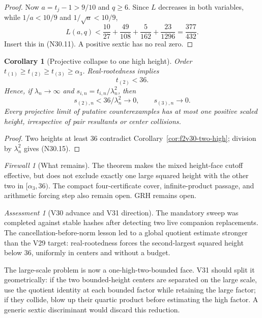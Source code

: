 \documentclass[11pt]{article}
\newtheorem{corollary}[theorem]{Corollary}
\theoremstyle{definition}
\theoremstyle{remark}
\newtheorem{assessment}[theorem]{Assessment}
\newtheorem{firewall}[theorem]{Firewall}
\begin{document}
\begin{proof}
Now \(a=t_j-1>9/10\) and \(q\geq6\).  Since \(L\) decreases in both
variables, while \(1/a<10/9\) and \(1/\sqrt a<10/9\),
\[
 L(a,q)<\frac{10}{27}+\frac{49}{108}
 +\frac5{162}+\frac{23}{1296}=\frac{377}{432}.
 \tag{N30.13}
\]
Insert this in \textup{(N30.11)}.  A positive sextic has no real zero.
\end{proof}

\begin{corollary}[Projective collapse to one high height]
\label{cor:f2v30-projective-collapse}
Order
\(t_{(1)}\geq t_{(2)}\geq t_{(3)}\geq\alpha_3\).  Real-rootedness implies
\[
 \boxed{t_{(2)}<36.}
 \tag{N30.14}
\]
Hence, if \(\lambda_n\to\infty\) and
\(s_{i,n}=t_{i,n}/\lambda_n^2\), then
\[
 s_{(2),n}<36/\lambda_n^2\longrightarrow0,\qquad
 s_{(3),n}\longrightarrow0.
 \tag{N30.15}
\]
Every projective limit of putative counterexamples has at most one
positive scaled height, irrespective of pair resultants or center
collisions.
\end{corollary}

\begin{proof}
Two heights at least \(36\) contradict
Corollary~\ref{cor:f2v30-two-high}; division by \(\lambda_n^2\) gives
\textup{(N30.15)}.
\end{proof}

\begin{firewall}[What remains]
\label{fire:f2v30}
The theorem makes the mixed height-face cutoff effective, but does not
exclude exactly one large squared height with the other two in
\([\alpha_3,36)\).  The compact four-certificate cover, infinite-product
passage, and arithmetic forcing step also remain open.  GRH remains open.
\end{firewall}

\begin{assessment}[V30 advance and V31 direction]
\label{ass:f2v30}
The mandatory sweep was completed against stable hashes after detecting two
live companion replacements.  The cancellation-before-norm lesson led to
a global quotient estimate stronger than the V29 target: real-rootedness
forces the second-largest squared height below \(36\), uniformly in centers
and without a budget.

The large-scale problem is now a one-high-two-bounded face.  V31 should
split it geometrically: if the two bounded-height centers are separated on
the large scale, use the quotient identity at each bounded factor while
retaining the large factor; if they collide, blow up their quartic product
before estimating the high factor.  A generic sextic discriminant would
discard this reduction.
\end{assessment}
\end{document}
